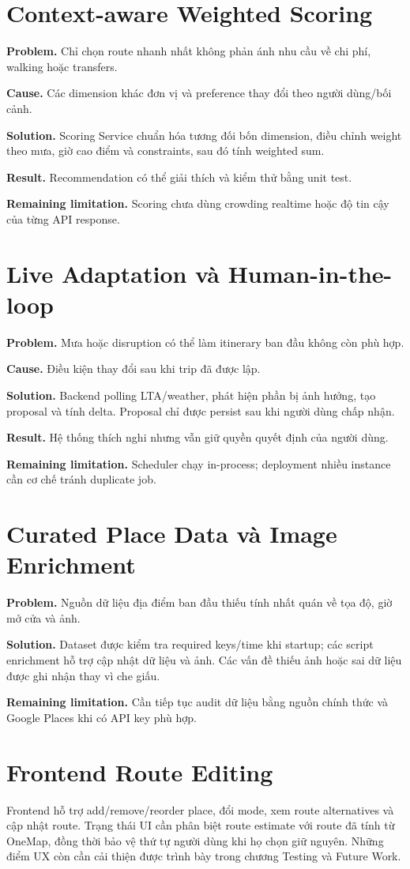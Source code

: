 \section{Context-aware Weighted Scoring}

\textbf{Problem.} Chỉ chọn route nhanh nhất không phản ánh nhu cầu về chi phí, walking hoặc transfers.

\textbf{Cause.} Các dimension khác đơn vị và preference thay đổi theo người dùng/bối cảnh.

\textbf{Solution.} Scoring Service chuẩn hóa tương đối bốn dimension, điều chỉnh weight theo mưa, giờ cao điểm và constraints, sau đó tính weighted sum.

\textbf{Result.} Recommendation có thể giải thích và kiểm thử bằng unit test.

\textbf{Remaining limitation.} Scoring chưa dùng crowding realtime hoặc độ tin cậy của từng API response.

\section{Live Adaptation và Human-in-the-loop}

\textbf{Problem.} Mưa hoặc disruption có thể làm itinerary ban đầu không còn phù hợp.

\textbf{Cause.} Điều kiện thay đổi sau khi trip đã được lập.

\textbf{Solution.} Backend polling LTA/weather, phát hiện phần bị ảnh hưởng, tạo proposal và tính delta. Proposal chỉ được persist sau khi người dùng chấp nhận.

\textbf{Result.} Hệ thống thích nghi nhưng vẫn giữ quyền quyết định của người dùng.

\textbf{Remaining limitation.} Scheduler chạy in-process; deployment nhiều instance cần cơ chế tránh duplicate job.

\section{Curated Place Data và Image Enrichment}

\textbf{Problem.} Nguồn dữ liệu địa điểm ban đầu thiếu tính nhất quán về tọa độ, giờ mở cửa và ảnh.

\textbf{Solution.} Dataset được kiểm tra required keys/time khi startup; các script enrichment hỗ trợ cập nhật dữ liệu và ảnh. Các vấn đề thiếu ảnh hoặc sai dữ liệu được ghi nhận thay vì che giấu.

\textbf{Remaining limitation.} Cần tiếp tục audit dữ liệu bằng nguồn chính thức và Google Places khi có API key phù hợp.

\section{Frontend Route Editing}

Frontend hỗ trợ add/remove/reorder place, đổi mode, xem route alternatives và cập nhật route. Trạng thái UI cần phân biệt route estimate với route đã tính từ OneMap, đồng thời bảo vệ thứ tự người dùng khi họ chọn giữ nguyên. Những điểm UX còn cần cải thiện được trình bày trong chương Testing và Future Work.
